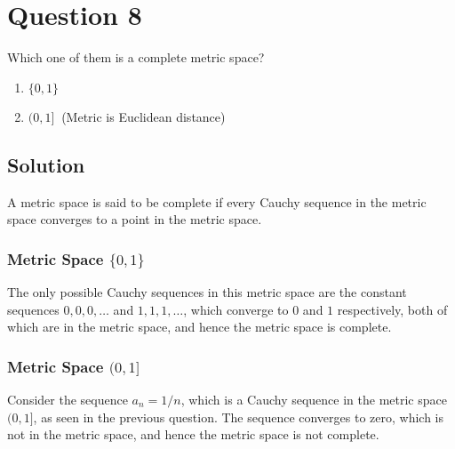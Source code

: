 \section*{Question 8}

Which one of them is a complete metric space?
\begin{enumerate}[noitemsep, nolistsep, label= (\alph*)]
    \item \( \{ 0,1 \} \)
    \item \( ( 0,1 ] \ \) (Metric is Euclidean distance)
\end{enumerate}

\subsection*{Solution}

A metric space is said to be complete if every Cauchy sequence in the metric space converges to a point in the metric space.

\subsubsection*{Metric Space \( \{ 0,1 \} \)}

The only possible Cauchy sequences in this metric space are the constant sequences \( 0, 0, 0, \dots \) and \( 1, 1, 1, \dots \), which converge to \( 0 \) and \( 1 \) respectively, both of which are in the metric space, and hence the metric space is complete.

\subsubsection*{Metric Space \( ( 0,1 ] \)}

Consider the sequence \( a_n = 1/n \), which is a Cauchy sequence in the metric space \( ( 0,1 ] \), as seen in the previous question.
The sequence converges to zero, which is not in the metric space, and hence the metric space is not complete.
